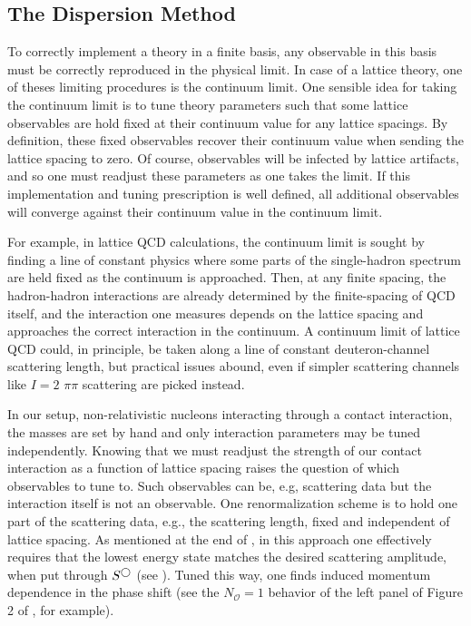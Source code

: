 \subsection{The Dispersion Method}\label{sec:dispersion}

To correctly implement a theory in a finite basis, any observable in this basis must be correctly reproduced in the physical limit.
In case of a lattice theory, one of theses limiting procedures is the continuum limit.
One sensible idea for taking the continuum limit is to tune theory parameters such that some lattice observables are hold fixed at their continuum value for any lattice spacings.
By definition, these fixed observables recover their continuum value when sending the lattice spacing to zero.
Of course, observables will be infected by lattice artifacts, and so one must readjust these parameters as one takes the limit.
If this implementation and tuning prescription is well defined, all additional observables will converge against their continuum value in the continuum limit.

For example, in lattice QCD calculations, the continuum limit is sought by finding a line of constant physics where some parts of the single-hadron spectrum are held fixed as the continuum is approached.
Then, at any finite spacing, the hadron-hadron interactions are already determined by the finite-spacing of QCD itself, and the interaction one measures depends on the lattice spacing and approaches the correct interaction in the continuum.
A continuum limit of lattice QCD could, in principle, be taken along a line of constant deuteron-channel scattering length, but practical issues abound, even if simpler scattering channels like $I=2$ $\pi\pi$ scattering are picked instead.

In our setup, non-relativistic nucleons interacting through a contact interaction, the masses are set by hand and only interaction parameters may be tuned independently.
Knowing that we must readjust the strength of our contact interaction as a function of lattice spacing raises the question of which observables to tune to.
Such observables can be, e.g, scattering data but the interaction itself is not an observable.
One renormalization scheme is to hold one part of the scattering data, e.g., the scattering length, fixed and independent of lattice spacing.
As mentioned at the end of , in this approach one effectively requires that the lowest energy state matches the desired scattering amplitude, when put through $S^{\bigcirc}$ (see ).
Tuned this way, one finds induced momentum dependence in the phase shift (see the $N_\mathcal{O}=1$ behavior of the left panel of Figure 2 of , for example).

